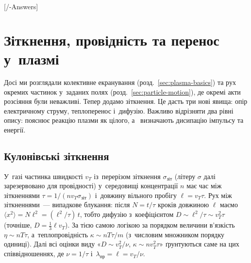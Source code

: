 

\graphicspath{{\currfilebase/Pictures}}

[\currfilebase/\currfilebase-Answers]
\chapter{Зіткнення, провідність та перенос у~плазмі}\label{sec:plasma-collisions}\hypertarget{plasma-collisions}{}

Досі ми розглядали колективне екранування (розд.~\ref{sec:plasma-basics}) та рух окремих частинок у~заданих полях
(розд.~\ref{sec:particle-motion}), де окремі акти розсіяння були неважливі. Тепер додамо зіткнення. Це дасть три нові
явища: опір електричному струму, теплоперенос і~дифузію. Важливо відрізняти два рівні
опису:  пояснює реакцію плазми як цілого, а~
визначають дисипацію імпульсу та енергії.

\section{Кулонівські зіткнення}

\begin{Theory}
У~газі частинка швидкості $v_T$ із~перерізом зіткнення $\sigma_{\mathrm{зіт}}$ (літеру $\sigma$ далі зарезервовано
для провідності) у~середовищі концентрації $n$ має
час між зіткненнями $\tau=1/(nv_T\sigma_{\mathrm{зіт}})$ і~довжину вільного пробігу $\ell=v_T\tau$.
Рух між зіткненнями~--- випадкове блукання: після $N=t/\tau$ кроків довжиною $\ell$ маємо
$\langle x^2\rangle=N\ell^2=(\ell^2/\tau)\,t$, тобто дифузію з~коефіцієнтом $D\sim\ell^2/\tau\sim v_T^2\tau$
(точніше, $D=\tfrac13\ell v_T$). За тією самою логікою за порядком величини
в'язкість $\eta\sim nT\tau$, а~теплопровідність $\kappa\sim nT\tau/m$ (з~числовим множником порядку одиниці).
Далі всі оцінки виду «$D\sim v_T^2/\nu$, $\kappa\sim nv_T^2\tau$» ґрунтуються саме на цих співвідношеннях,
де $\nu=1/\tau$ і~$\lambda_{\mathrm{пр}}=\ell=v_T/\nu$.
\end{Theory}

